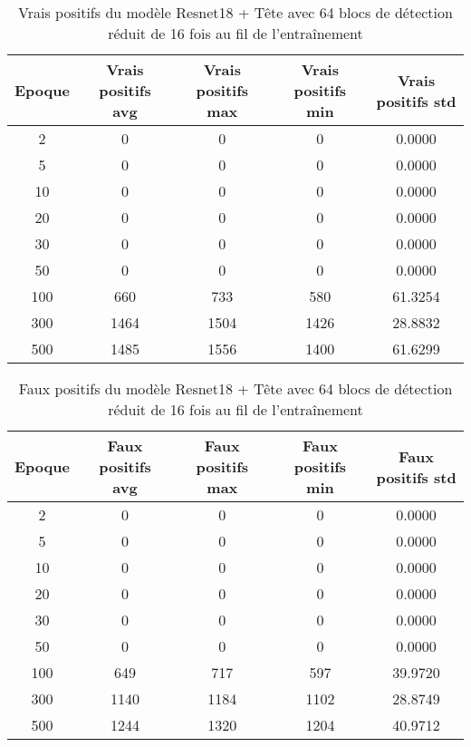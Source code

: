 \begin{table}[!ht]
    \caption{Vrais positifs du modèle Resnet18 + Tête avec 64 blocs de détection réduit de 16 fois au fil de l'entraînement}
    \label{tab:resnet18+head_64n_true_positive_reduced_16x_precision}
    \centering
    \begin{tabular}{ |c||c|c|c|c|  }
        \hline
        \rowcolor{gray!50}
        Epoque & Vrais positifs avg & Vrais positifs max & Vrais positifs min & Vrais positifs std\\
        \hline
        2 & 0 & 0 & 0 & 0.0000\\
        5 & 0 & 0 & 0 & 0.0000\\
        10 & 0 & 0 & 0 & 0.0000\\
        20 & 0 & 0 & 0 & 0.0000\\
        30 & 0 & 0 & 0 & 0.0000\\
        50 & 0 & 0 & 0 & 0.0000\\
        100 & 660 & 733 & 580 & 61.3254\\
        300 & 1464 & 1504 & 1426 & 28.8832\\
        500 & 1485 & 1556 & 1400 & 61.6299\\
        \hline
    \end{tabular}
\end{table}

\begin{table}[!ht]
    \caption{Faux positifs du modèle Resnet18 + Tête avec 64 blocs de détection réduit de 16 fois au fil de l'entraînement}
    \label{tab:resnet18+head_64n_false_positive_reduced_16x_precision}
    \centering
    \begin{tabular}{ |c||c|c|c|c|  }
        \hline
        \rowcolor{gray!50}
        Epoque & Faux positifs avg & Faux positifs max & Faux positifs min & Faux positifs std\\
        \hline
        2 & 0 & 0 & 0 & 0.0000\\
        5 & 0 & 0 & 0 & 0.0000\\
        10 & 0 & 0 & 0 & 0.0000\\
        20 & 0 & 0 & 0 & 0.0000\\
        30 & 0 & 0 & 0 & 0.0000\\
        50 & 0 & 0 & 0 & 0.0000\\
        100 & 649 & 717 & 597 & 39.9720\\
        300 & 1140 & 1184 & 1102 & 28.8749\\
        500 & 1244 & 1320 & 1204 & 40.9712\\
        \hline
    \end{tabular}
\end{table}

